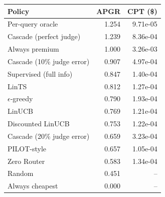 \begin{tabular}{lrr}
\toprule
Policy & APGR & CPT (\$) \\
\midrule
Per-query oracle & 1.254 & 9.71e-05 \\
Cascade (perfect judge) & 1.239 & 8.36e-04 \\
Always premium & 1.000 & 3.26e-03 \\
Cascade (10\% judge error) & 0.907 & 4.97e-04 \\
Supervised (full info) & 0.847 & 1.40e-04 \\
LinTS & 0.812 & 1.27e-04 \\
$\epsilon$-greedy & 0.790 & 1.93e-04 \\
LinUCB & 0.769 & 1.21e-04 \\
Discounted LinUCB & 0.753 & 1.22e-04 \\
Cascade (20\% judge error) & 0.659 & 3.23e-04 \\
PILOT-style & 0.657 & 1.05e-04 \\
Zero Router & 0.583 & 1.34e-04 \\
Random & 0.451 & -- \\
Always cheapest & 0.000 & -- \\
\bottomrule
\end{tabular}